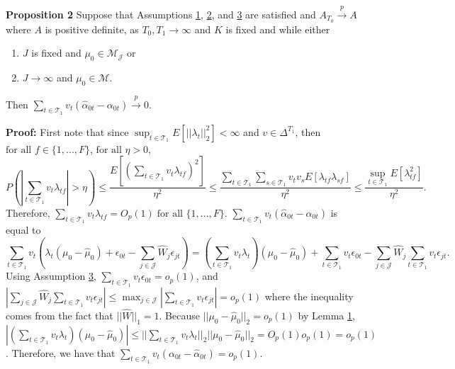 \documentclass{article}
\begin{document}
\textbf{Proposition 2} Suppose that Assumptions \hyperref[A1]{1}, \hyperref[A2]{2}, and \hyperref[A3]{3} are satisfied and $A_{T_0} \overset{p}{\rightarrow} A$ where $A$ is positive definite, as $T_0 , T_1 \rightarrow \infty$ and $K$ is fixed and while either 
\begin{enumerate}[label=(\roman*)]
    \item $J$ is fixed and $\mu_0 \in \mathcal{M}_{\mathcal{J}}$ or
    \item $J \rightarrow \infty$ and $\mu_0 \in \mathcal{M}$.
\end{enumerate}
Then $\sum_{t \in \mathcal{T}_1} v_t (\hat{\alpha}_{0t} - \alpha_{0t}) \overset{p}{\rightarrow} 0$.

\textbf{Proof:} First note that since $\sup_{t \in \mathcal{T}_1} E[||\lambda_t||_2^2] < \infty$ and $v \in \Delta^{T_1}$, then $\text{for all } f \in \{1,...,F\}$, $\text{for all } \eta > 0$,
\begin{equation*}
    P(|\sum_{t \in \mathcal{T}_1} v_t \lambda_{tf}| > \eta) \leq \frac{E[(\sum_{t \in \mathcal{T}_1} v_t \lambda_{tf})^2]}{\eta^2} \leq \frac{\sum_{t \in \mathcal{T}_1} \sum_{s \in \mathcal{T}_1} v_t v_s E[\lambda_{tf}\lambda_{sf}] }{\eta^2} \leq \frac{\sup_{t \in \mathcal{T}_1} E[\lambda_{tf}^2]}{\eta^2}.
\end{equation*}
Therefore, $\sum_{t \in \mathcal{T}_1} v_t \lambda_{tf} = O_p(1) \; \text{for all } \{1,...,F\}$. $\sum_{t \in \mathcal{T}_1} v_t ( \hat{\alpha}_{0t} - \alpha_{0t})$ is equal to
$$\sum_{t \in \mathcal{T}_1} v_t (\lambda_t (\mu_0 - \hat{\mu}_0) + \epsilon_{0t} - \sum_{j \in \mathcal{J}} \hat{W}_j \epsilon_{jt}) = ( \sum_{t \in \mathcal{T}_1}v_t \lambda_t) (\mu_0 - \hat{\mu}_0) + \sum_{t \in \mathcal{T}_1}  v_t \epsilon_{0t} - \sum_{j \in \mathcal{J}} \hat{W}_j  \sum_{t \in \mathcal{T}_1} v_t \epsilon_{jt}.$$ Using Assumption \hyperref[A3]{3}, $\sum_{t \in \mathcal{T}_1} v_t \epsilon_{0t} = o_p(1)$, and $|\sum_{j \in \mathcal{J}} \hat{W}_j \sum_{t \in \mathcal{T}_1} v_t \epsilon_{jt}| \leq \max_{j \in \mathcal{J}} |\sum_{t \in \mathcal{T}_1} v_t\epsilon_{jt}| = o_p(1)$ where the inequality comes from the fact that $||\hat{W}||_1 = 1$. Because $||\mu_0 - \hat{\mu}_0||_2 = o_p(1)$ by Lemma \hyperref[L1]{1}, $| (\sum_{t \in \mathcal{T}_1}v_t \lambda_t) (\mu_0 - \hat{\mu}_0)| \leq ||\sum_{t \in \mathcal{T}_1}v_t \lambda_t||_2 ||\mu_0 - \hat{\mu}_0||_2 = O_p(1) o_p(1) = o_p(1)$. Therefore, we have that $\sum_{t \in \mathcal{T}_1} v_t( \alpha_{0t} - \hat{\alpha}_{0t}) = o_p(1)$.
\end{document}
